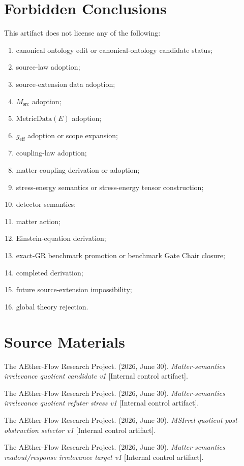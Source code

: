\section{Forbidden Conclusions}

This artifact does not license any of the following:
\begin{enumerate}
  \item canonical ontology edit or canonical-ontology candidate status;
  \item source-law adoption;
  \item source-extension data adoption;
  \item \(M_{\mathrm{src}}\) adoption;
  \item \(\mathrm{MetricData}(E)\) adoption;
  \item \(g_{\mathrm{eff}}\) adoption or scope expansion;
  \item coupling-law adoption;
  \item matter-coupling derivation or adoption;
  \item stress-energy semantics or stress-energy tensor construction;
  \item detector semantics;
  \item matter action;
  \item Einstein-equation derivation;
  \item exact-GR benchmark promotion or benchmark Gate Chair closure;
  \item completed derivation;
  \item future source-extension impossibility;
  \item global theory rejection.
\end{enumerate}

\section{Source Materials}

The AEther-Flow Research Project. (2026, June 30). \emph{Matter-semantics
irrelevance quotient candidate v1} [Internal control artifact].

The AEther-Flow Research Project. (2026, June 30). \emph{Matter-semantics
irrelevance quotient refuter stress v1} [Internal control artifact].

The AEther-Flow Research Project. (2026, June 30). \emph{MSIrrel quotient
post-obstruction selector v1} [Internal control artifact].

The AEther-Flow Research Project. (2026, June 30). \emph{Matter-semantics
readout/response irrelevance target v1} [Internal control artifact].
